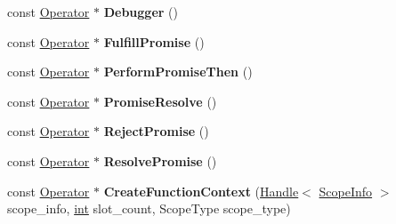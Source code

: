 \begin{DoxyCompactItemize}
const \mbox{\hyperlink{classv8_1_1internal_1_1compiler_1_1Operator}{Operator}} $\ast$ {\bfseries Debugger} ()
\item 
\mbox{\label{classv8_1_1internal_1_1compiler_1_1JSOperatorBuilder_a70bc89fd0f342b30c886d69f9090d504}} 
const \mbox{\hyperlink{classv8_1_1internal_1_1compiler_1_1Operator}{Operator}} $\ast$ {\bfseries Fulfill\+Promise} ()
\item 
\mbox{\label{classv8_1_1internal_1_1compiler_1_1JSOperatorBuilder_a908b81fcd4ee4252465c029c899dd608}} 
const \mbox{\hyperlink{classv8_1_1internal_1_1compiler_1_1Operator}{Operator}} $\ast$ {\bfseries Perform\+Promise\+Then} ()
\item 
\mbox{\label{classv8_1_1internal_1_1compiler_1_1JSOperatorBuilder_acfb3bf36a7033c4ba04eaf3cd4e0116b}} 
const \mbox{\hyperlink{classv8_1_1internal_1_1compiler_1_1Operator}{Operator}} $\ast$ {\bfseries Promise\+Resolve} ()
\item 
\mbox{\label{classv8_1_1internal_1_1compiler_1_1JSOperatorBuilder_a3324d97377ada395a9a197ed075e7f69}} 
const \mbox{\hyperlink{classv8_1_1internal_1_1compiler_1_1Operator}{Operator}} $\ast$ {\bfseries Reject\+Promise} ()
\item 
\mbox{\label{classv8_1_1internal_1_1compiler_1_1JSOperatorBuilder_a639b81f6d663b9d37a7ed1eccff14e99}} 
const \mbox{\hyperlink{classv8_1_1internal_1_1compiler_1_1Operator}{Operator}} $\ast$ {\bfseries Resolve\+Promise} ()
\item 
\mbox{\label{classv8_1_1internal_1_1compiler_1_1JSOperatorBuilder_a9d8599697003c1824198e6f09cc15652}} 
const \mbox{\hyperlink{classv8_1_1internal_1_1compiler_1_1Operator}{Operator}} $\ast$ {\bfseries Create\+Function\+Context} (\mbox{\hyperlink{classv8_1_1internal_1_1Handle}{Handle}}$<$ \mbox{\hyperlink{classv8_1_1internal_1_1ScopeInfo}{Scope\+Info}} $>$ scope\+\_\+info, \mbox{\hyperlink{classint}{int}} slot\+\_\+count, Scope\+Type scope\+\_\+type)
\item 

\end{DoxyCompactItemize}
